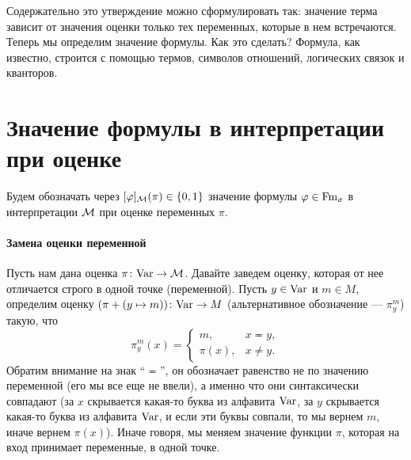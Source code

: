 Содержательно это утверждение можно сформулировать так: значение терма зависит от значения оценки только тех переменных, которые в нем встречаются.
Теперь мы определим значение формулы.
Как это сделать?
Формула, как известно, строится с помощью термов, символов отношений, логических связок и кванторов.

\section{Значение формулы в интерпретации при оценке}

\begin{notation*}
    Будем обозначать через $[\varphi]_{\mathcal{M}}(\pi) \in \{0, 1\}$ значение формулы $\varphi \in \mathrm{Fm}_{\sigma}$ в интерпретации $\mathcal{M}$ при оценке переменных $\pi$.
\end{notation*}

\paragraph{Замена оценки переменной}
Пусть нам дана оценка $\pi \colon \mathrm{Var} \to \mathcal{M}$.
Давайте заведем оценку, которая от нее отличается строго в одной точке (переменной).
Пусть $y \in \mathrm{Var}$ и $m \in M$, определим оценку $(\pi + (y \mapsto m)) \colon \mathrm{Var} \to M$ (альтернативное обозначение --- $\pi_{y}^{m}$) такую, что
$$
    \pi_{y}^{m}(x) = \begin{cases}
        m, & x \eqcirc y, \\
        \pi(x), & x \neq y.
    \end{cases}
$$
Обратим внимание на знак \enquote{$\eqcirc$}, он обозначает равенство не по значению переменной (его мы все еще не ввели), а именно что они синтаксически совпадают (за $x$ скрывается какая-то буква из алфавита $\mathrm{Var}$, за $y$ скрывается какая-то буква из алфавита $\mathrm{Var}$, и если эти буквы совпали, то мы вернем $m$, иначе вернем $\pi(x)$).
Иначе говоря, мы меняем значение функции $\pi$, которая на вход принимает переменные, в одной точке.

